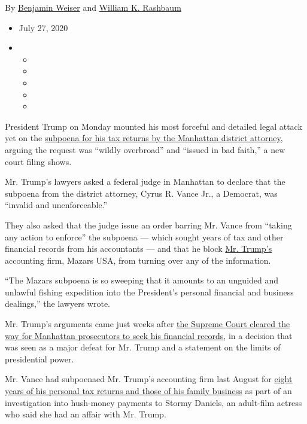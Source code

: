 By \href{https://www.nytimes3xbfgragh.onion/by/benjamin-weiser}{Benjamin
Weiser} and
\href{https://www.nytimes3xbfgragh.onion/by/william-k-rashbaum}{William
K. Rashbaum}

\begin{itemize}
\item
  July 27, 2020
\item
  \begin{itemize}
  \item
  \item
  \item
  \item
  \item
  \end{itemize}
\end{itemize}

President Trump on Monday mounted his most forceful and detailed legal
attack yet on the
\href{https://www.nytimes3xbfgragh.onion/2020/08/03/nyregion/donald-trump-taxes-cyrus-vance.html}{subpoena
for his tax returns by the Manhattan district attorney}, arguing the
request was ``wildly overbroad'' and ``issued in bad faith,'' a new
court filing shows.

Mr. Trump's lawyers asked a federal judge in Manhattan to declare that
the subpoena from the district attorney, Cyrus R. Vance Jr., a Democrat,
was ``invalid and unenforceable.''

They also asked that the judge issue an order barring Mr. Vance from
``taking any action to enforce'' the subpoena --- which sought years of
tax and other financial records from his accountants --- and that he
block
\href{https://www.nytimes3xbfgragh.onion/2020/07/28/us/politics/donald-fred-trump.html}{Mr.
Trump's} accounting firm, Mazars USA, from turning over any of the
information.

``The Mazars subpoena is so sweeping that it amounts to an unguided and
unlawful fishing expedition into the President's personal financial and
business dealings,'' the lawyers wrote.

Mr. Trump's arguments came just weeks after
\href{https://www.nytimes3xbfgragh.onion/2020/07/09/us/trump-taxes-supreme-court.html?action=click\&module=RelatedLinks\&pgtype=Article}{the
Supreme Court cleared the way for Manhattan prosecutors to seek his
financial records}, in a decision that was seen as a major defeat for
Mr. Trump and a statement on the limits of presidential power.

Mr. Vance had subpoenaed Mr. Trump's accounting firm last August for
\href{https://www.nytimes3xbfgragh.onion/2019/09/16/nyregion/trump-tax-returns-cy-vance.html}{eight
years of his personal tax returns and those of his family business} as
part of an investigation into hush-money payments to Stormy Daniels, an
adult-film actress who said she had an affair with Mr. Trump.

